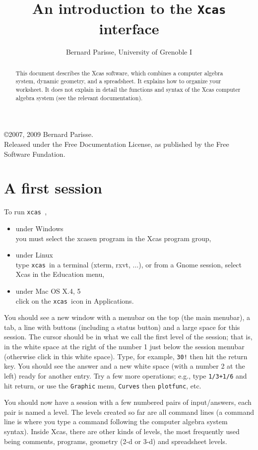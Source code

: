 \documentclass{article}
\title{An introduction to the {\tt Xcas} interface}
\author{Bernard Parisse, University of Grenoble I}
\date{}
\newcommand{\xcas}{{\tt xcas }}
\begin{document}
\maketitle

\copyright 2007, 2009 Bernard Parisse. \\
Released under the Free Documentation License, 
as published by the Free Software Fundation.

\begin{abstract}
This document describes the Xcas software, which combines 
a computer algebra system, dynamic geometry, and a spreadsheet. 
It explains how to organize your worksheet. It does not
explain in detail the functions and syntax of the Xcas 
computer algebra system (see the relevant documentation).
\end{abstract}

\section{A first session}
To run \xcas, 
\begin{itemize}
\item under Windows\\
you must select the xcasen program in the Xcas program group,
\item under Linux\\
type \xcas in a terminal (xterm, rxvt, ...), 
or from a Gnome session, select Xcas in the Education menu,
\item under Mac OS X.4, 5\\
click on the \xcas icon in Applications.
\end{itemize}

You should see a new window with a menubar on the top (the main
menubar), a tab, a line with buttons (including a status button)
and a large space for this session. The cursor should
be in what we call the first level of the session; that is, in 
the white space at the right of the number 1 just
below the session menubar (otherwise click in this white space).
Type, for example, {\tt 30!} then hit the return key. 
You should see the answer and a new white space (with a number
2 at the left) ready for another entry.
Try a few more operations; e.g., type {\tt 1/3+1/6}
and hit return, or use the {\tt Graphic} menu, {\tt Curves} then
{\tt plotfunc}, etc.

You should now have a session with a few numbered pairs of
input/answers, each pair is named a level. The levels created so far
are all command lines (a command line is where you
type a command following the computer algebra system syntax).
Inside Xcas, there are other kinds of levels, the most frequently used
being comments, programs, geometry (2-d or 3-d) and spreadsheet levels.
\end{document}
